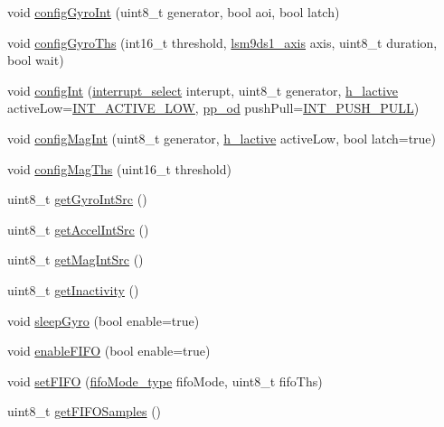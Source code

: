 \begin{DoxyCompactItemize}
\item 
void \hyperlink{class_l_s_m9_d_s1_a19a341728c4e5b454de045c8a531cf06}{config\+Gyro\+Int} (uint8\+\_\+t generator, bool aoi, bool latch)
\item 
void \hyperlink{class_l_s_m9_d_s1_ad865cc972960ed476fabd54f698adf6e}{config\+Gyro\+Ths} (int16\+\_\+t threshold, \hyperlink{_spark_fun_l_s_m9_d_s1_8h_adcbc07abda18c22c46d0a1129bb61164}{lsm9ds1\+\_\+axis} axis, uint8\+\_\+t duration, bool wait)
\item 
void \hyperlink{class_l_s_m9_d_s1_a5b6948b9d4caf57cfe9e0559a0c7f54c}{config\+Int} (\hyperlink{_l_s_m9_d_s1___types_8h_a6261e8b8f54e4b66959cf92f93141a40}{interrupt\+\_\+select} interupt, uint8\+\_\+t generator, \hyperlink{_l_s_m9_d_s1___types_8h_ac99a793e4542699cb1b621bdac865ba7}{h\+\_\+lactive} active\+Low=\hyperlink{_l_s_m9_d_s1___types_8h_ac99a793e4542699cb1b621bdac865ba7a3f37d3df875092889b3df55cb542f6be}{I\+N\+T\+\_\+\+A\+C\+T\+I\+V\+E\+\_\+\+L\+OW}, \hyperlink{_l_s_m9_d_s1___types_8h_a60d66fa4435ec836a2f1e82fa6b10053}{pp\+\_\+od} push\+Pull=\hyperlink{_l_s_m9_d_s1___types_8h_a60d66fa4435ec836a2f1e82fa6b10053a68a6e4216b18873633e97522e231fd8e}{I\+N\+T\+\_\+\+P\+U\+S\+H\+\_\+\+P\+U\+LL})
\item 
void \hyperlink{class_l_s_m9_d_s1_a54a521668eb63d504d227c6d460723e0}{config\+Mag\+Int} (uint8\+\_\+t generator, \hyperlink{_l_s_m9_d_s1___types_8h_ac99a793e4542699cb1b621bdac865ba7}{h\+\_\+lactive} active\+Low, bool latch=true)
\item 
void \hyperlink{class_l_s_m9_d_s1_a87cf3dd3a4d9ca79106eb7c1c866a224}{config\+Mag\+Ths} (uint16\+\_\+t threshold)
\item 
uint8\+\_\+t \hyperlink{class_l_s_m9_d_s1_aaba6696754df62a411a6a190100f9ca3}{get\+Gyro\+Int\+Src} ()
\item 
uint8\+\_\+t \hyperlink{class_l_s_m9_d_s1_ae42ae3b368370f977d090ba0e53c7f5c}{get\+Accel\+Int\+Src} ()
\item 
uint8\+\_\+t \hyperlink{class_l_s_m9_d_s1_a2bc92a37db982059b89e0a06e7d05a95}{get\+Mag\+Int\+Src} ()
\item 
uint8\+\_\+t \hyperlink{class_l_s_m9_d_s1_a9dab029d1d24e49709258d893042d28f}{get\+Inactivity} ()
\item 
void \hyperlink{class_l_s_m9_d_s1_a13b61812069b399547f177b0b0af8fe3}{sleep\+Gyro} (bool enable=true)
\item 
void \hyperlink{class_l_s_m9_d_s1_a5f01141131318697838f15d7e5d10f2c}{enable\+F\+I\+FO} (bool enable=true)
\item 
void \hyperlink{class_l_s_m9_d_s1_a0ec4a93a34545af1acc336bae9b360f1}{set\+F\+I\+FO} (\hyperlink{_l_s_m9_d_s1___types_8h_abd0fd05ddd88dadb906475b36c8266db}{fifo\+Mode\+\_\+type} fifo\+Mode, uint8\+\_\+t fifo\+Ths)
\item 
uint8\+\_\+t \hyperlink{class_l_s_m9_d_s1_ac03ef2ff928a25c4a80af7707cd92dc8}{get\+F\+I\+F\+O\+Samples} ()
\end{DoxyCompactItemize}
